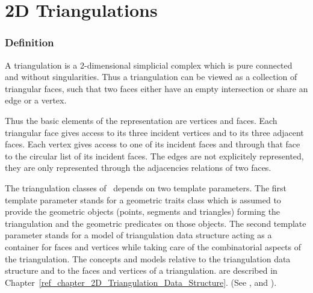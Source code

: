 
\chapter{2D Triangulations}
\label{ref_chapter_2D_Triangulations}

\subsection*{Definition}
A triangulation is a 2-dimensional simplicial complex which is pure
connected and without singularities. Thus a triangulation
can be viewed as a collection of triangular faces,
such that two faces either have an empty intersection or share an edge or a vertex.

Thus the basic elements of the representation are vertices and faces.
Each triangular face gives access to its three incident vertices 
and to its three adjacent faces. 
Each vertex gives access to one of its incident faces
and through that face to the circular list of its incident faces.
The edges are not explicitely represented, they are only represented 
through the adjacencies relations of two faces.

The triangulation classes of \cgal\ depends on two template parameters.
The first template parameter stands for
 a geometric traits class which is assumed to provide
the geometric objects (points, segments and triangles) 
forming  the triangulation and the geometric predicates on those objects.
The second template parameter stands for a model
of  triangulation data
structure acting as a container for faces and vertices
while  taking care of the combinatorial aspects of the triangulation. 
The concepts and models relative to the triangulation data structure
and to the faces and vertices of a triangulation.
are described in
Chapter~\ref{ref_chapter_2D_Triangulation_Data_Structure}.
(See 
,
 and 
 ).


